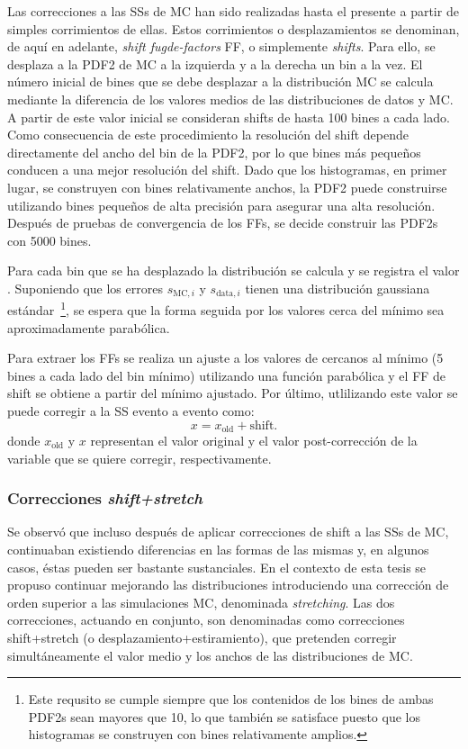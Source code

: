 Las correcciones a las \acp{SS} de \ac{MC} han sido realizadas hasta el presente a partir de simples corrimientos de ellas. Estos corrimientos o desplazamientos se denominan, de aquí en adelante, \textit{shift fugde-factors} \ac{FF}, o simplemente \textit{shifts}.
Para ello, se desplaza a la \ac{PDF2} de \ac{MC} a la izquierda y a la derecha un bin a la vez.
El número inicial de bines que se debe desplazar a la distribución \ac{MC} se calcula mediante la diferencia de los valores medios de las distribuciones de datos y \ac{MC}. A partir de este valor inicial se consideran shifts de hasta 100 bines a cada lado.
Como consecuencia de este procedimiento la resolución del shift depende directamente del ancho del bin de la \ac{PDF2}, por lo que bines más pequeños conducen a una mejor resolución del shift. Dado que los histogramas, en primer lugar, se construyen con bines relativamente anchos, la \ac{PDF2} puede construirse utilizando bines pequeños de alta precisión para asegurar una alta resolución. Después de pruebas de convergencia de los \acp{FF}, se decide construir las \acp{PDF2} con 5000 bines.

Para cada bin que se ha desplazado la distribución se calcula y se registra el valor \chisq. Suponiendo que los errores \(s_{\text{MC},i}\) y \(s_{\text{data},i}\) tienen una distribución gaussiana estándar~\footnote{Este requsito se cumple siempre que los contenidos de los bines de ambas \acp{PDF2} sean mayores que 10, lo que también se satisface puesto que los histogramas se construyen con bines relativamente amplios.}, se espera que la forma seguida por los valores \chisq cerca del mínimo sea aproximadamente parabólica.

Para extraer los \acp{FF} se realiza un ajuste a los valores de \chisq cercanos al mínimo (5 bines a cada lado del bin mínimo) utilizando una función parabólica y el \ac{FF} de shift se obtiene a partir del mínimo ajustado. Por último, utlilizando este valor se puede corregir a la \ac{SS} evento a evento como:
\[
	x = x_{\text{old}} + \text{shift}.
\]
donde \(x_{\text{old}}\) y \(x\) representan el valor original y el valor post-corrección de la variable que se quiere corregir, respectivamente.


\subsubsection{Correcciones \textit{shift+stretch}}

Se observó que incluso después de aplicar correcciones de shift a las \acp{SS} de \ac{MC}, continuaban existiendo diferencias en las formas de las mismas y, en algunos casos, éstas pueden ser bastante sustanciales. 
En el contexto de esta tesis se propuso continuar mejorando las distribuciones introduciendo una corrección de orden superior a las simulaciones \ac{MC}, denominada \textit{stretching}. Las dos correcciones, actuando en conjunto, son denominadas como correcciones shift+stretch (o desplazamiento+estiramiento), que pretenden corregir simultáneamente el valor medio y los anchos de las distribuciones de \ac{MC}.

